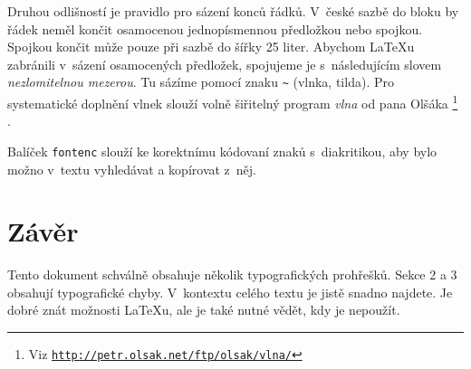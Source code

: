 \documentclass[a4paper, 10pt, twocolumn]{article}
\begin{document}
    Druhou odlišností je pravidlo pro sázení konců řádků. V~české sazbě do bloku by řádek
    neměl končit osamocenou jednopísmennou předložkou nebo spojkou. Spojkou  končit
    může pouze při sazbě do šířky 25 liter. Abychom \LaTeX u zabránili v~sázení osamocených
    předložek, spojujeme je s~následujícím slovem \emph{nezlomitelnou mezerou}.
    Tu sázíme pomocí znaku \verb!~! (vlnka, tilda). Pro systematické doplnění vlnek slouží volně
    šiřitelný program \emph{vlna} od pana Olšáka%
    \footnote[2]{Viz \texttt{\href{http://petr.olsak.net/ftp/olsak/vlna/}{http://petr.olsak.net/ftp/olsak/vlna/}}}%
    .

    Balíček \texttt{fontenc} slouží ke korektnímu kódovaní znaků s~diakritikou, aby bylo
    možno v~textu vyhledávat a kopírovat z~něj.

    \section{Závěr}
    Tento dokument schválně obsahuje několik typografických prohřešků. Sekce 2 a 3 obsahují
    typografické chyby. V~kontextu celého textu je jistě snadno najdete. Je dobré znát možnosti
    \LaTeX u, ale je také nutné vědět, kdy je nepoužít.
\end{document}
